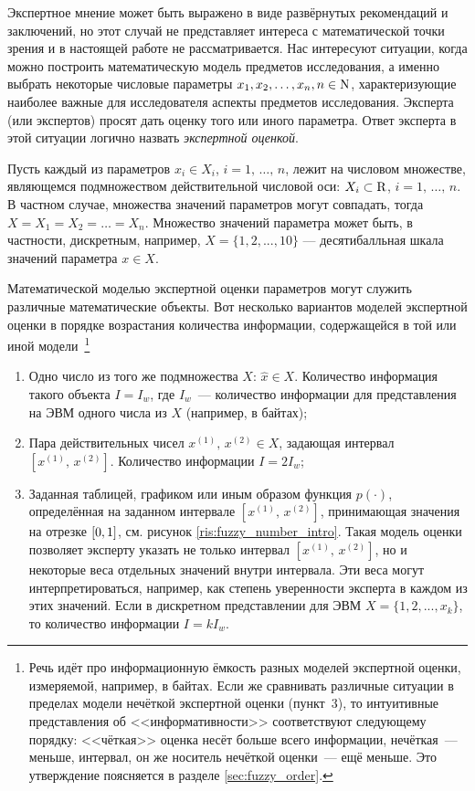Экспертное мнение может быть выражено в виде развёрнутых рекомендаций и заключений, но этот случай не представляет интереса с математической точки зрения и в настоящей работе не рассматривается.  Нас интересуют ситуации, когда можно построить математическую модель предметов исследования, а именно выбрать некоторые числовые параметры $x_1, x_2, \ldots, x_n, n \in {\mathrm{N}}$, характеризующие наиболее важные для исследователя аспекты предметов исследования. Эксперта (или экспертов) просят дать  оценку того или иного параметра. Ответ эксперта в этой ситуации логично назвать {\sl экспертной оценкой}. 

Пусть каждый из параметров $x_i \in X_i$,  $i=1,\, \ldots,\, n$, лежит на числовом множестве, являющемся подмножеством действительной числовой оси: $X_i \subset {\mathrm{R}}$, $i=1,\, \ldots,\, n$. В частном случае, множества значений параметров могут совпадать, тогда $X = X_1 = X_2 = \ldots = X_n$. Множество значений параметра может быть, в частности, дискретным, например, $X = \{1, 2, ..., 10\}$ --- десятибалльная шкала значений параметра $x \in X$.

Математической моделью экспертной оценки параметров могут служить различные математические объекты. Вот несколько вариантов моделей экспертной оценки в порядке возрастания количества информации, содержащейся в той или иной модели~\footnote{Речь идёт про информационную ёмкость разных моделей экспертной оценки, измеряемой, например, в байтах. Если же сравнивать различные ситуации в пределах модели нечёткой экспертной оценки (пункт~3), то интуитивные представления об <<информативности>> соответствуют следующему порядку: <<чёткая>> оценка несёт больше всего информации, нечёткая~--- меньше, интервал, он же носитель нечёткой оценки~--- ещё меньше. Это утверждение поясняется в разделе \ref{sec:fuzzy_order}. } 
\begin{enumerate}
  \item Одно число из того же подмножества $X$: $\hat{x} \in X$. Количество информация такого объекта $I = I_w$, где $I_w$~--- количество информации для представления на ЭВМ одного числа из $X$ (например, в байтах);
  \item Пара действительных чисел $x^{(1)},\, x^{(2)} \in X$, задающая интервал $[x^{(1)},\, x^{(2)}]$. Количество информации $I = 2I_w$;
  \item Заданная таблицей, графиком или иным образом функция $p(\cdot)$, определённая на заданном интервале $[x^{(1)},\, x^{(2)}]$, принимающая значения на отрезке $[0,1]$, см. рисунок \ref{ris:fuzzy_number_intro}. Такая модель оценки позволяет эксперту указать не только интервал $[x^{(1)},\, x^{(2)}]$, но и некоторые веса отдельных значений внутри интервала. Эти веса могут интерпретироваться, например, как степень уверенности эксперта в каждом из этих значений. Если в дискретном представлении для ЭВМ $X = \{1, 2, ..., x_{k}\}$, то количество информации $I = kI_w$. 
\end{enumerate}

